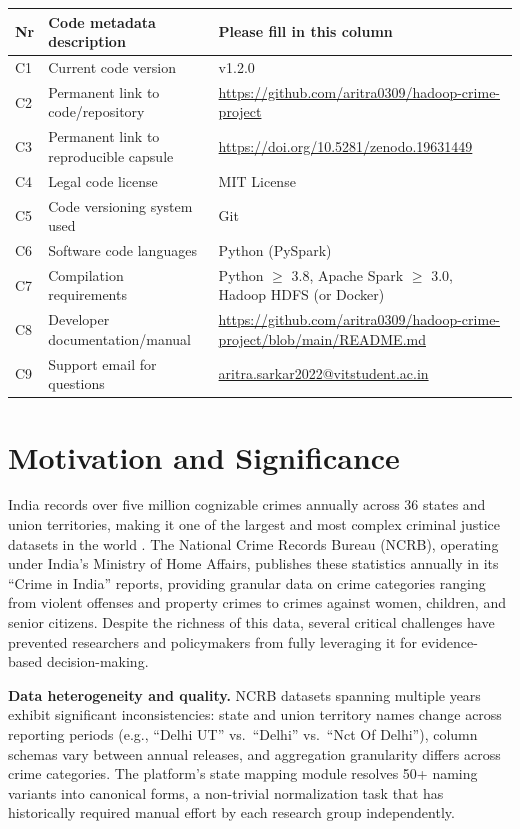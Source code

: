 \documentclass[a4paper,12pt]{article}
\begin{document}
\begin{table}[h!]
\small
\begin{tabularx}{\textwidth}{|l|l|X|}
\hline
\textbf{Nr} & \textbf{Code metadata description} & \textbf{Please fill in this column} \\
\hline
C1 & Current code version & v1.2.0 \\
\hline
C2 & Permanent link to code/repository & \url{https://github.com/aritra0309/hadoop-crime-project} \\
\hline
C3 & Permanent link to reproducible capsule & \url{https://doi.org/10.5281/zenodo.19631449} \\
\hline
C4 & Legal code license & MIT License \\
\hline
C5 & Code versioning system used & Git \\
\hline
C6 & Software code languages & Python (PySpark) \\
\hline
C7 & Compilation requirements & Python $\geq$ 3.8, Apache Spark $\geq$ 3.0, Hadoop HDFS (or Docker) \\
\hline
C8 & Developer documentation/manual & \url{https://github.com/aritra0309/hadoop-crime-project/blob/main/README.md} \\
\hline
C9 & Support email for questions & \href{mailto:aritra.sarkar2022@vitstudent.ac.in}{aritra.sarkar2022@vitstudent.ac.in} \\
\hline
\end{tabularx}
\end{table}

\section{Motivation and Significance}

India records over five million cognizable crimes annually across 36 states and union territories, making it one of the largest and most complex criminal justice datasets in the world \cite{ncrb2021}. The National Crime Records Bureau (NCRB), operating under India's Ministry of Home Affairs, publishes these statistics annually in its ``Crime in India'' reports, providing granular data on crime categories ranging from violent offenses and property crimes to crimes against women, children, and senior citizens. Despite the richness of this data, several critical challenges have prevented researchers and policymakers from fully leveraging it for evidence-based decision-making.

\textbf{Data heterogeneity and quality.} NCRB datasets spanning multiple years exhibit significant inconsistencies: state and union territory names change across reporting periods (e.g., ``Delhi UT'' vs.\ ``Delhi'' vs.\ ``Nct Of Delhi''), column schemas vary between annual releases, and aggregation granularity differs across crime categories. The platform's state mapping module resolves 50+ naming variants into canonical forms, a non-trivial normalization task that has historically required manual effort by each research group independently.
\end{document}
